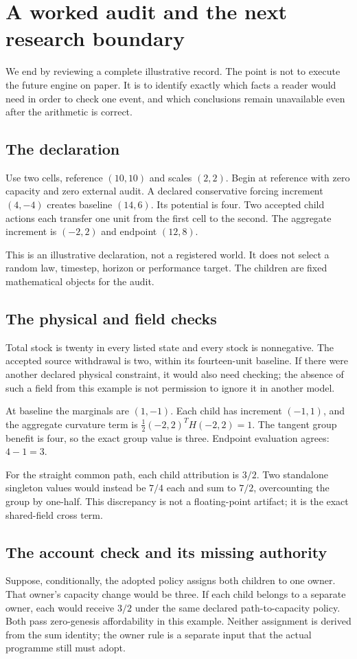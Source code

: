 \chapter{A worked audit and the next research boundary}\label{ch:next}
We end by reviewing a complete illustrative record. The point is not to
execute the future engine on paper. It is to identify exactly which facts
a reader would need in order to check one event, and which conclusions
remain unavailable even after the arithmetic is correct.

\section{The declaration}
Use two cells, reference $(10,10)$ and scales $(2,2)$. Begin at reference
with zero capacity and zero external audit. A declared conservative forcing
increment $(4,-4)$ creates baseline $(14,6)$. Its potential is four.
Two accepted child actions each transfer one unit from the first cell to
the second. The aggregate increment is $(-2,2)$ and endpoint $(12,8)$.

This is an illustrative declaration, not a registered world. It does not
select a random law, timestep, horizon or performance target. The children
are fixed mathematical objects for the audit.

\section{The physical and field checks}
Total stock is twenty in every listed state and every stock is nonnegative.
The accepted source withdrawal is two, within its fourteen-unit baseline.
If there were another declared physical constraint, it would also need
checking; the absence of such a field from this example is not permission
to ignore it in another model.

At baseline the marginals are $(1,-1)$. Each child has increment $(-1,1)$,
and the aggregate curvature term is
$\tfrac12(-2,2)^TH(-2,2)=1$. The tangent group benefit is four, so
the exact group value is three. Endpoint evaluation agrees: $4-1=3$.

For the straight common path, each child attribution is $3/2$. Two
standalone singleton values would instead be $7/4$ each and sum to
$7/2$, overcounting the group by one-half. This discrepancy is not a
floating-point artifact; it is the exact shared-field cross term.

\section{The account check and its missing authority}
Suppose, conditionally, the adopted policy assigns both children to one
owner. That owner's capacity change would be three. If each child belongs
to a separate owner, each would receive $3/2$ under the same declared
path-to-capacity policy. Both pass zero-genesis affordability in this example.
Neither assignment is derived from the sum identity; the owner rule is a
separate input that the actual programme still must adopt.

